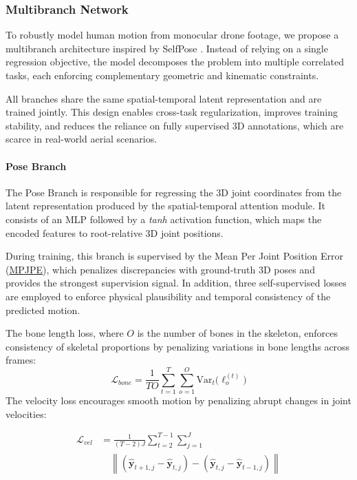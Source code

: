 \documentclass[11pt,a4paper,twocolumn]{article}
\begin{document}
\subsubsection{Multibranch Network}
To robustly model human motion from monocular drone footage, we propose a multibranch architecture inspired by SelfPose \cite{tome2020selfpose}.
Instead of relying on a single regression objective, the model decomposes the problem into multiple correlated tasks, each enforcing complementary geometric and kinematic constraints.

All branches share the same spatial-temporal latent representation and are trained jointly.
This design enables cross-task regularization, improves training stability, and reduces the reliance on fully supervised 3D annotations, which are scarce in real-world aerial scenarios.

\paragraph{Pose Branch}
The Pose Branch is responsible for regressing the 3D joint coordinates from the latent representation produced by the spatial-temporal attention module.
It consists of an MLP followed by a \textit{tanh} activation function, which maps the encoded features to root-relative 3D joint positions.

During training, this branch is supervised by the Mean Per Joint Position Error (\hyperref[eq:mpjpe]{MPJPE}), which penalizes discrepancies with ground-truth 3D poses and provides the strongest supervision signal.
In addition, three self-supervised losses are employed to enforce physical plausibility and temporal consistency of the predicted motion.

The bone length loss, where $O$ is the number of bones in the skeleton, enforces consistency of skeletal proportions by penalizing variations in bone lengths across frames:
\begin{equation}
    \mathcal{L}_{bone} = \frac{1}{TO} \sum_{t=1}^{T} \sum_{o=1}^{O} \text{Var}_{t} \bigl( \ell_{o}^{(t)} \bigr)
\end{equation}
The velocity loss encourages smooth motion by penalizing abrupt changes in joint velocities:

{\small
\begin{equation}
    \begin{split}
    \mathcal{L}_{vel} &= \frac{1}{(T-2)J} 
    \sum_{t=2}^{T-1} \sum_{j=1}^{J} \\
    &\quad \left\| (\hat{\mathbf{y}}_{t+1,j} - \hat{\mathbf{y}}_{t,j}) 
    - (\hat{\mathbf{y}}_{t,j} - \hat{\mathbf{y}}_{t-1,j}) \right\|
    \end{split}
\end{equation}
}
\end{document}
